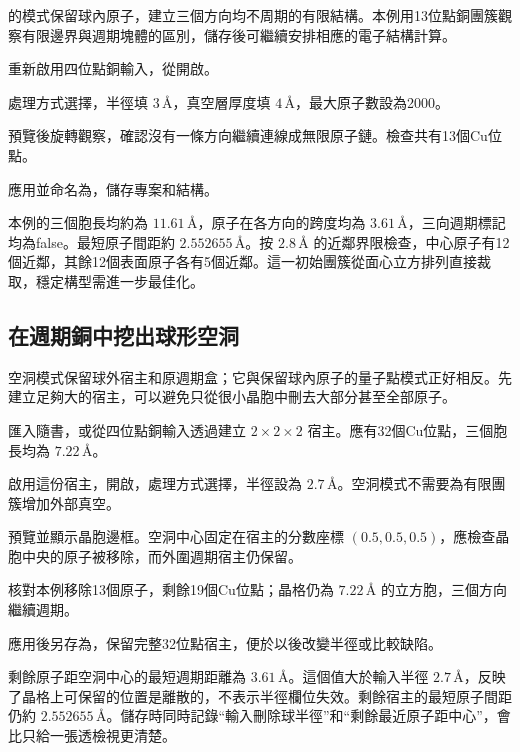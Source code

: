 的模式保留球內原子，建立三個方向均不周期的有限結構。本例用13位點銅團簇觀察有限邊界與週期塊體的區別，儲存後可繼續安排相應的電子結構計算。

\begin{steps}
  \item 重新啟用四位點銅輸入，從開啟。
  \item 處理方式選擇，半徑填 $3\,\text{\AA}$，真空層厚度填 $4\,\text{\AA}$，最大原子數設為2000。
  \item 預覽後旋轉觀察，確認沒有一條方向繼續連線成無限原子鏈。檢查共有13個Cu位點。
  \item 應用並命名為，儲存專案和結構。
\end{steps}

本例的三個胞長均約為 $11.61\,\text{\AA}$，原子在各方向的跨度均為 $3.61\,\text{\AA}$，三向週期標記均為false。最短原子間距約 $2.552655\,\text{\AA}$。按 $2.8\,\text{\AA}$ 的近鄰界限檢查，中心原子有12個近鄰，其餘12個表面原子各有5個近鄰。這一初始團簇從面心立方排列直接裁取，穩定構型需進一步最佳化。

\subsection{在週期銅中挖出球形空洞}

空洞模式保留球外宿主和原週期盒；它與保留球內原子的量子點模式正好相反。先建立足夠大的宿主，可以避免只從很小晶胞中刪去大部分甚至全部原子。

\begin{steps}
  \item 匯入隨書，或從四位點銅輸入透過建立 $2\times2\times2$ 宿主。應有32個Cu位點，三個胞長均為 $7.22\,\text{\AA}$。
  \item 啟用這份宿主，開啟，處理方式選擇，半徑設為 $2.7\,\text{\AA}$。空洞模式不需要為有限團簇增加外部真空。
  \item 預覽並顯示晶胞邊框。空洞中心固定在宿主的分數座標 \((0.5,0.5,0.5)\)，應檢查晶胞中央的原子被移除，而外圍週期宿主仍保留。
  \item 核對本例移除13個原子，剩餘19個Cu位點；晶格仍為 $7.22\,\text{\AA}$ 的立方胞，三個方向繼續週期。
  \item 應用後另存為，保留完整32位點宿主，便於以後改變半徑或比較缺陷。
\end{steps}

剩餘原子距空洞中心的最短週期距離為 $3.61\,\text{\AA}$。這個值大於輸入半徑 $2.7\,\text{\AA}$，反映了晶格上可保留的位置是離散的，不表示半徑欄位失效。剩餘宿主的最短原子間距仍約 $2.552655\,\text{\AA}$。儲存時同時記錄“輸入刪除球半徑”和“剩餘最近原子距中心”，會比只給一張透檢視更清楚。

